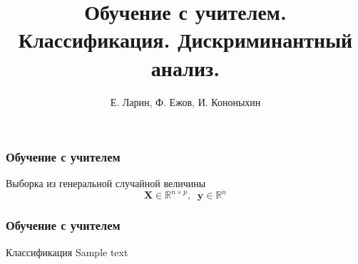 \documentclass[11pt]{beamer}
\begin{document}
	\author{Е. Ларин, Ф. Ежов, И. Кононыхин }
	\title{Обучение с учителем. Классификация. Дискриминантный анализ. }
	\date{}
	\subject{Семинар по статистическому и машинному обучению}
	\begin{frame}[plain]
		\maketitle 
	\end{frame}
	
	\begin{frame}
		\frametitle{Обучение с учителем}
		Выборка из генеральной случайной величины
		\begin{equation}\bm{X} \in \mathbb{R}^{n\times p}, \;\;\mathbf{y}\in \mathbb{R}^n\end{equation}
		
		
	\end{frame}
	\begin{frame}
		\frametitle{Обучение с учителем}
		\begin{block}{Классификация}
			Sample text
		\end{block}
	\end{frame}
\end{document}
